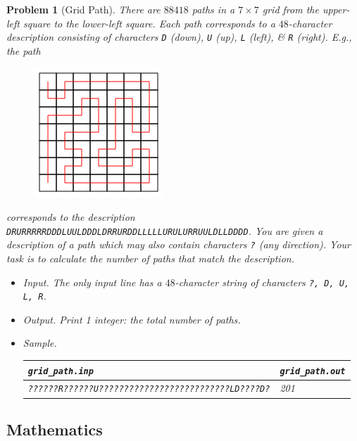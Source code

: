 \documentclass{article}
\newtheorem{problem}{Problem}
\begin{document}
\begin{problem}[Grid Path]
	There are $88418$ paths in a $7\times7$ grid from the upper-left square to the lower-left square. Each path corresponds to a $48$-character description consisting of characters {\tt D} (down), {\tt U} (up), {\tt L} (left), \& {\tt R} (right). E.g., the path
	\begin{figure}[H]
		\centering
		\includegraphics[scale=.5]{grid_path}
	\end{figure}
	\noindent corresponds to the description {\tt DRURRRRRDDDLUULDDDLDRRURDDLLLLLURULURRUULDLLDDDD}. You are given a description of a path which may also contain characters {\tt?} (any direction). Your task is to calculate the number of paths that match the description.
	\begin{itemize}
		\item {\sf Input.} The only input line has a $48$-character string of characters {\tt?, D, U, L, R}.
		\item {\sf Output.} Print 1 integer: the total number of paths.
		\item {\sf Sample.}
		\begin{table}[H]
			\centering
			\begin{tabular}{|l|l|}
				\hline
				\verb|grid_path.inp| & \verb|grid_path.out| \\
				\hline
				{\tt??????R??????U??????????????????????????LD????D?} & 201 \\
				\hline
			\end{tabular}
		\end{table}
	\end{itemize}
\end{problem}


\subsection{Mathematics}


\printbibliography[heading=bibintoc]
\end{document}
